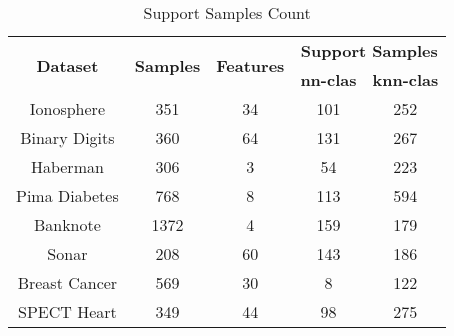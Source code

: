 \begin{table}[H]
\centering
\begin{tabular}{|c|c|c|c|c|}
\hline
\multirow{2}{*}{\textbf{Dataset}} & \multirow{2}{*}{\textbf{Samples}} & \multirow{2}{*}{\textbf{Features}} & \multicolumn{2}{c|}{\textbf{Support Samples}} \\ \cline{4-5}
 & & & \textbf{nn-clas} & \textbf{knn-clas} \\ \hline
Ionosphere & 351 & 34 & 101 & 252 \\ \hline
Binary Digits & 360 & 64 & 131 & 267 \\ \hline
Haberman & 306 & 3 & 54 & 223 \\ \hline
Pima Diabetes & 768 & 8 & 113 & 594 \\ \hline
Banknote & 1372 & 4 & 159 & 179 \\ \hline
Sonar & 208 & 60 & 143 & 186 \\ \hline
Breast Cancer & 569 & 30 & 8 & 122 \\ \hline
SPECT Heart & 349 & 44 & 98 & 275 \\ \hline
\end{tabular}
\caption{Support Samples Count}
\label{tab:support}
\end{table}